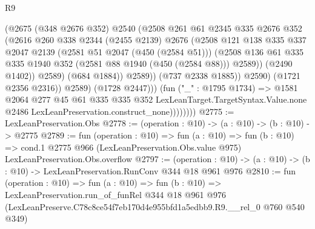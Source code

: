\begin{lexlean}{R9}
\begin{coremodule}
                                  (@2675
                                    (@348 @2676 @352)
                                    @2540
                                    (@2508
                                      @261
                                      @61
                                      @2345
                                      @335
                                      @2676
                                      @352
                                      (@2616
                                        @260
                                        @338
                                        @2344
                                        (@2455 @2139)
                                        @2676
                                        (@2508
                                          @121
                                          @138
                                          @335
                                          @337
                                          @2047
                                          @2139
                                          (@2581 @51 @2047 (@450 (@2584 @51)))
                                          (@2508
                                            @136
                                            @61
                                            @335
                                            @335
                                            @1940
                                            @352
                                            (@2581 @88 @1940 (@450 (@2584 @88)))
                                            @2589))
                                        (@2490 @1402))
                                      @2589)
                                    (@684 @1884))
                                  @2589))
                              (@737 @2338 @1885))
                            @2590)
                          (@1721 @2356 @2316))
                        @2589)
                      (@1728 @2447)))
                  (fun ("_" : @1795 @1734) =>
                  @1581
                    @2064
                    @277
                    @45
                    @61
                    @335
                    @335
                    @352
                    LexLeanTarget.TargetSyntax.Value.none
                    @2486
                    LexLeanPreservation.construct_none))))))))
@2775 := LexLeanPreservation.Obs
@2778 := (operation : @10) -> (a : @10) -> (b : @10) -> @2775
@2789 := fun (operation : @10) =>
  fun (a : @10) =>
  fun (b : @10) =>
  cond.{1} @2775 @966 (LexLeanPreservation.Obs.value @975) LexLeanPreservation.Obs.overflow
@2797 := (operation : @10) ->
  (a : @10) -> (b : @10) -> LexLeanPreservation.RunConv @344 @18 @961 @976
@2810 := fun (operation : @10) =>
  fun (a : @10) =>
  fun (b : @10) =>
  LexLeanPreservation.run_of_funRel
    @344
    @18
    @961
    @976
    (LexLeanPreserve.C78c8ce54f7eb170d4e955bfd1a5edbb9.R9.__rel_0 @760 @540 @349)
\end{coremodule}
\end{lexlean}
